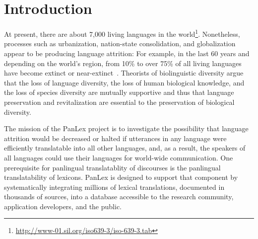 \documentclass[sw]{iosart2c}
\newcommand*{\origtodo}{}
\let\origtodo\todo
\renewcommand*{\todo}{\origtodo[inline]}
\begin{document}
\section{Introduction}
\label{sec:intro}
At present, there are about 7,000 living languages in the world\footnote{\url{http://www-01.sil.org/iso639-3/iso-639-3.tab}}.
Nonetheless, processes such as urbanization, nation-state consolidation, and globalization appear to be producing language attrition: For example, in the last 60 years and depending on the world's region, from 10\% to over 75\% of all living languages have become extinct or near-extinct~\cite{lang_crisis}.\todo{Jonathan: Please check statement}
Theorists of biolinguistic diversity argue that the loss of language diversity, the loss of human biological knowledge, and the loss of species diversity are mutually supportive and thus that language preservation and revitalization are essential to the preservation of biological diversity\cite{nettle}.

The mission of the PanLex project is to investigate the possibility that language attrition would be decreased or halted if utterances in any language were efficiently translatable into all other languages, and, as a result, the speakers of all languages could use their languages for world-wide communication.
One prerequisite for panlingual translatablity of discourses is the panlingual translatability of lexicons.
PanLex is designed to support that component by systematically integrating millions of lexical translations, documented in thousands of sources, into a database accessible to the research community, application developers, and the public.
\end{document}
